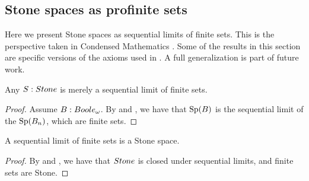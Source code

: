 
\subsection{Stone spaces as profinite sets}
Here we present Stone spaces as sequential limits of finite sets. 
This is the perspective taken in Condensed Mathematics \cite{Condensed,Dagur,Scholze}.
Some of the results in this section are specific versions of the axioms used in 
\cite{bc24}. A full generalization is part of future work. 

\begin{lemma}
  Any $S:\Stone$ is merely a sequential limit of finite sets. 
\end{lemma}
\begin{proof}
  Assume $B:\Boole$. By  and , %
 we have that $\operatorname{Sp}(B)$ is the sequential limit of the $\operatorname{Sp}(B_n)$, which are finite sets. 
\end{proof}

\begin{lemma}\label{StoneAreProfinite}
  A sequential limit of finite sets is a Stone space. 
\end{lemma}
\begin{proof}
  By  and %
  , 
  we have that $\Stone$ is closed under sequential limits, and finite sets are Stone.
\end{proof}

